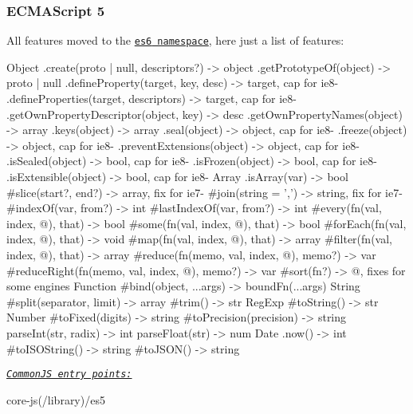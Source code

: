  \subsubsection*{E\+C\+M\+A\+Script 5}

All features moved to the \href{#ecmascript-6}{\tt {\ttfamily es6} namespace}, here just a list of features\+: 
\begin{DoxyCode}
Object
  .create(proto | null, descriptors?)    -> object
  .getPrototypeOf(object)                -> proto | null
  .defineProperty(target, key, desc)     -> target, cap for ie8-
  .defineProperties(target, descriptors) -> target, cap for ie8-
  .getOwnPropertyDescriptor(object, key) -> desc
  .getOwnPropertyNames(object)           -> array
  .keys(object)                          -> array
  .seal(object)                          -> object, cap for ie8-
  .freeze(object)                        -> object, cap for ie8-
  .preventExtensions(object)             -> object, cap for ie8-
  .isSealed(object)                      -> bool, cap for ie8-
  .isFrozen(object)                      -> bool, cap for ie8-
  .isExtensible(object)                  -> bool, cap for ie8-
Array
  .isArray(var)                                -> bool
  #slice(start?, end?)                         -> array, fix for ie7-
  #join(string = ',')                          -> string, fix for ie7-
  #indexOf(var, from?)                         -> int
  #lastIndexOf(var, from?)                     -> int
  #every(fn(val, index, @), that)              -> bool
  #some(fn(val, index, @), that)               -> bool
  #forEach(fn(val, index, @), that)            -> void
  #map(fn(val, index, @), that)                -> array
  #filter(fn(val, index, @), that)             -> array
  #reduce(fn(memo, val, index, @), memo?)      -> var
  #reduceRight(fn(memo, val, index, @), memo?) -> var
  #sort(fn?)                                   -> @, fixes for some engines
Function
  #bind(object, ...args) -> boundFn(...args)
String
  #split(separator, limit) -> array
  #trim()                  -> str
RegExp
  #toString() -> str
Number
  #toFixed(digits)        -> string
  #toPrecision(precision) -> string
parseInt(str, radix) -> int
parseFloat(str)      -> num
Date
  .now()         -> int
  #toISOString() -> string
  #toJSON()      -> string
\end{DoxyCode}
 \href{#commonjs}{\tt {\itshape Common\+JS entry points\+:}} 
\begin{DoxyCode}
core-js(/library)/es5
\end{DoxyCode}


